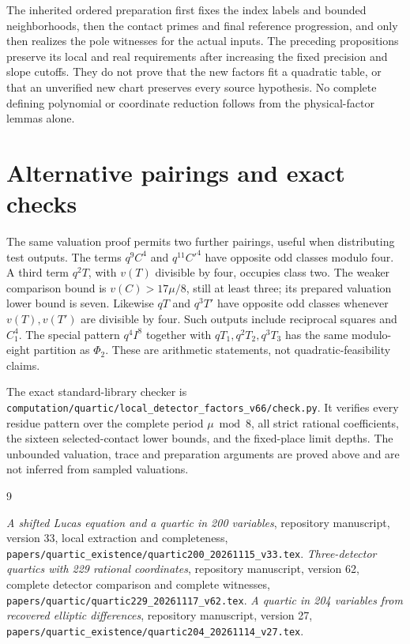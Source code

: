 \documentclass[11pt,a4paper]{article}
\begin{document}
The inherited ordered preparation first fixes the index labels and
bounded neighborhoods, then the contact primes and final reference
progression, and only then realizes the pole witnesses for the
actual inputs. The preceding propositions preserve its local and
real requirements after increasing the fixed precision and slope
cutoffs. They do not prove that the new factors fit a quadratic
table, or that an unverified new chart preserves every source
hypothesis. No complete defining polynomial or coordinate reduction
follows from the physical-factor lemmas alone.

\section{Alternative pairings and exact checks}

The same valuation proof permits two further pairings, useful when
distributing test outputs. The terms $q^9C^4$ and $q^{11}C'^4$
have opposite odd classes modulo four. A third term $q^2T$, with
$v(T)$ divisible by four, occupies class two. The weaker comparison
bound is $v(C)>17\mu/8$, still at least three; its prepared
valuation lower bound is seven. Likewise $qT$ and $q^3T'$ have
opposite odd classes whenever $v(T),v(T')$ are divisible by four.
Such outputs include reciprocal squares and $C_1^4$.
The special pattern $q^4I^8$ together with $qT_1,q^2T_2,q^3T_3$
has the same modulo-eight partition as $\Phi_2$.
These are arithmetic statements, not quadratic-feasibility claims.

The exact standard-library checker is
\nolinkurl{computation/quartic/local_detector_factors_v66/check.py}.
It verifies every residue pattern over the complete period
$\mu\bmod8$, all strict rational coefficients, the sixteen
selected-contact lower bounds, and the fixed-place limit depths.
The unbounded valuation, trace and preparation arguments are proved
above and are not inferred from sampled valuations.

\begin{thebibliography}{9}\raggedright
{}\emph{A shifted Lucas equation and a quartic in 200 variables},
repository manuscript, version 33, local extraction and completeness,
\nolinkurl{papers/quartic_existence/quartic200_20261115_v33.tex}.
\emph{Three-detector quartics with 229 rational coordinates},
repository manuscript, version 62, complete detector comparison and
complete witnesses,
\nolinkurl{papers/quartic/quartic229_20261117_v62.tex}.
\emph{A quartic in 204 variables from recovered elliptic differences},
repository manuscript, version 27,
\nolinkurl{papers/quartic_existence/quartic204_20261114_v27.tex}.
\end{thebibliography}
\end{document}
